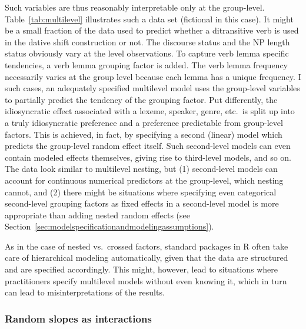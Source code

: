 \documentclass[a4paper,12pt]{article}
\begin{document}
Such variables are thus reasonably interpretable only at the group-level.
Table~\ref{tab:multilevel} illustrates such a data set (fictional in this case).
It might be a small fraction of the data used to predict whether a ditransitive verb is used in the dative shift construction or not.
The discourse status and the NP length status obviously vary at the level observations.
To capture verb lemma specific tendencies, a verb lemma grouping factor is added.
The verb lemma frequency necessarily varies at the group level because each lemma has a unique frequency.
I such cases, an adequately specified multilevel model uses the group-level variables to partially predict the tendency of the grouping factor.
Put differently, the idiosyncratic effect associated with a lexeme, speaker, genre, etc.\ is split up into a truly idiosyncratic preference and a preference predictable from group-level factors.
This is achieved, in fact, by specifying a second (linear) model which predicts the group-level random effect itself.
Such second-level models can even contain modeled effects themselves, giving rise to third-level models, and so on.
The data look similar to multilevel nesting, but (1) second-level models can account for continuous numerical predictors at the group-level, which nesting cannot, and (2) there might be situations where specifying even categorical second-level grouping factors as fixed effects in a second-level model is more appropriate than adding nested random effects (see Section~\ref{sec:modelspecificationandmodelingassumptions}).

As in the case of nested vs.\ crossed factors, standard packages in R often take care of hierarchical modeling automatically, given that the data are structured and are specified accordingly.
This might, however, lead to situations where practitioners specify multilevel models without even knowing it, which in turn can lead to misinterpretations of the results.

\subsubsection{Random slopes as interactions}
\label{sec:randominterceptsandslopes}
\end{document}
